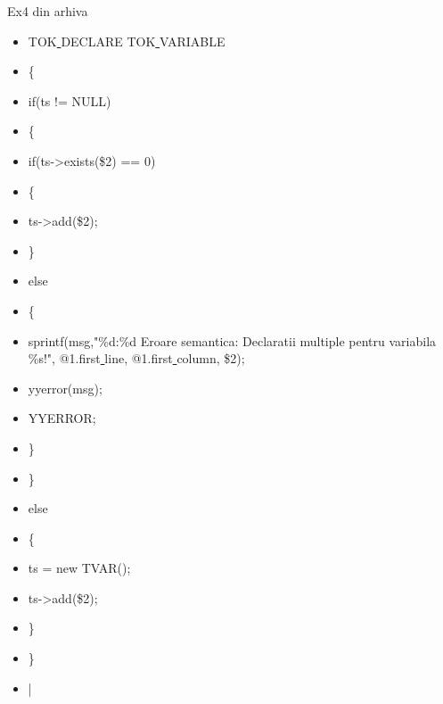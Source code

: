 \documentclass[pdf]{beamer}
\begin{document}
\begin{frame}[shrink=20]{Ex4 din arhiva}
\begin{itemize}
\item
 TOK\underline{ }DECLARE TOK\underline{ }VARIABLE
\item \hspace{4mm}
      \{
\item \hspace{6mm}
	if(ts != NULL)
\item \hspace{6mm}
	\{
\item \hspace{8mm}
	  if(ts->exists(\$2) == 0)
\item \hspace{8mm}
	  \{
\item \hspace{10mm}
	    ts->add(\$2);
\item \hspace{8mm}
	  \}
\item \hspace{8mm}
	  else
\item \hspace{8mm}
	  \{
\item \hspace{10mm}
	    sprintf(msg,"\%d:\%d Eroare semantica: Declaratii multiple pentru variabila \%s!", @1.first\underline{ }line, @1.first\underline{ }column, \$2);
\item \hspace{10mm}
	    yyerror(msg);
\item \hspace{10mm}
	    YYERROR;
\item \hspace{8mm}
	  \}
\item \hspace{6mm}
	\}
\item \hspace{6mm}
	else
\item \hspace{6mm}
	\{
\item \hspace{8mm}
	  ts = new TVAR();
\item \hspace{8mm}
	  ts->add(\$2);
\item \hspace{6mm}
	\}
\item \hspace{4mm}
      \}
\item \hspace{2mm}
    |
\end{itemize}
\end{frame}
\end{document}
